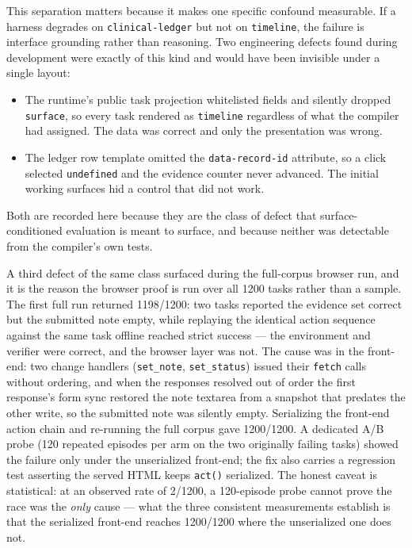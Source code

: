 \documentclass[
]{article}
\providecommand{\tightlist}{%
  \setlength{\itemsep}{0pt}\setlength{\parskip}{0pt}}
\begin{document}
This separation matters because it makes one specific confound
measurable. If a harness degrades on \texttt{clinical-ledger} but not on
\texttt{timeline}, the failure is interface grounding rather than
reasoning. Two engineering defects found during development were exactly
of this kind and would have been invisible under a single layout:

\begin{itemize}
\tightlist
\item
  The runtime's public task projection whitelisted fields and silently
  dropped \texttt{surface}, so every task rendered as \texttt{timeline}
  regardless of what the compiler had assigned. The data was correct and
  only the presentation was wrong.
\item
  The ledger row template omitted the \texttt{data-record-id} attribute,
  so a click selected \texttt{undefined} and the evidence counter never
  advanced. The initial working surfaces hid a control that did not
  work.
\end{itemize}

Both are recorded here because they are the class of defect that
surface-conditioned evaluation is meant to surface, and because neither
was detectable from the compiler's own tests.

A third defect of the same class surfaced during the full-corpus browser
run, and it is the reason the browser proof is run over all 1200 tasks
rather than a sample. The first full run returned 1198/1200: two tasks
reported the evidence set correct but the submitted note empty, while
replaying the identical action sequence against the same task offline
reached strict success --- the environment and verifier were correct,
and the browser layer was not. The cause was in the front-end: two
change handlers (\texttt{set\_note}, \texttt{set\_status}) issued their
\texttt{fetch} calls without ordering, and when the responses resolved
out of order the first response's form sync restored the note textarea
from a snapshot that predates the other write, so the submitted note was
silently empty. Serializing the front-end action chain and re-running
the full corpus gave 1200/1200. A dedicated A/B probe (120 repeated
episodes per arm on the two originally failing tasks) showed the failure
only under the unserialized front-end; the fix also carries a regression
test asserting the served HTML keeps \texttt{act()} serialized. The
honest caveat is statistical: at an observed rate of 2/1200, a
120-episode probe cannot prove the race was the \emph{only} cause ---
what the three consistent measurements establish is that the serialized
front-end reaches 1200/1200 where the unserialized one does not.
\end{document}
